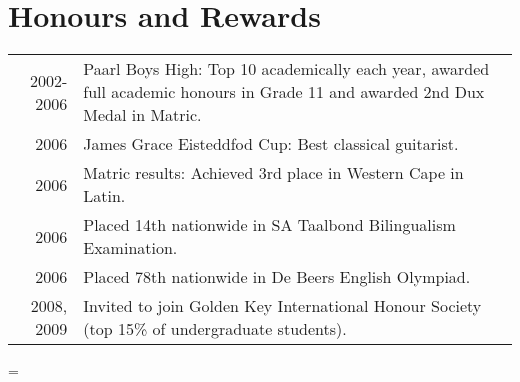 \documentclass[a4paper,10pt,notitlepage]{article}
\newenvironment{absolutelynopagebreak}
  {\par\nobreak\vfil\penalty0\vfilneg
   \vtop\bgroup}
  {\par\xdef\tpd{\the\prevdepth}\egroup
   \prevdepth=\tpd}
\begin{document}
\begin{absolutelynopagebreak}
\section{Honours and Rewards}
\begin{tabular}{r|p{11cm}}
 \textsc{2002-2006} & Paarl Boys High: Top 10 academically each year, awarded full academic honours in Grade 11 and awarded 2nd Dux Medal in Matric. \\
 \textsc{2006} & James Grace Eisteddfod Cup: Best classical guitarist. \\
 \textsc{2006} & Matric results: Achieved 3rd place in Western Cape in Latin. \\
 \textsc{2006} & Placed 14th nationwide in SA Taalbond Bilingualism Examination. \\
 \textsc{2006} & Placed 78th nationwide in De Beers English Olympiad. \\
 \textsc{2008, 2009} & Invited to join Golden Key International Honour Society (top 15\% of undergraduate students).
\end{tabular}

\end{absolutelynopagebreak}


\addtolength{\voffset}{-0.2cm} %
\end{document}
